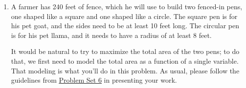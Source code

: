 \documentclass{article}
\makeatletter
\let\@href=\href
\renewcommand{\href}[2]{\@href{#1}{\ul{#2}}}
\makeatother
\begin{document}
\begin{enumerate}
\begin{enumerate}
    \begin{problem}[\vfill]
      Does $f$ have a global maximum on $(-\infty, \infty)$?
    \end{problem}

    \begin{solution}
      We don't have enough information. It's possible that the global maximum could
      occur at $x=2$, but it's also possible that there is no global maximum, for example
      if $f$ increases without bound after $x=6$. 
    \end{solution}

  \item

    \begin{grading}
      1.5 points: 0.5 for knowing it does, 1 for saying where it could occur
    \end{grading}

    \begin{problem}[\vfill\newpage]
      Does $f$ have a global minimum on $(-\infty, \infty)$?
    \end{problem}

    \begin{solution}
      Definitely yes. The global minimum must occur at either $x=-3$ or at $x=6$. 
    \end{solution}

  \end{enumerate}

\item  

  A farmer has 240 feet of fence, which he will use to build two fenced-in pens, one shaped like a square and one shaped like a circle. The square pen is for his pet goat, and the sides need to be at least 10 feet long. The circular pen is for his pet llama, and it needs to have a radius of at least 8 feet.

  It would be natural to try to maximize the total area of the two pens; to do that, we first need to model the total area as a function of a single variable. That modeling is what you'll do in this problem. As usual, please follow the guidelines from \href{https://canvas.harvard.edu/files/20704944/download?download_frd=1}{Problem Set 6} in presenting your work. 


\end{enumerate}
\end{document}
